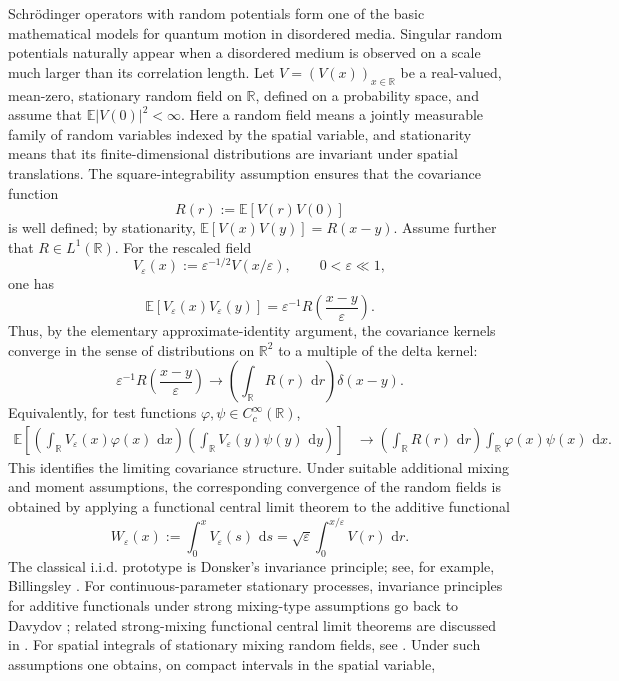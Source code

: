 \documentclass[11pt]{article}
\newcommand{\dd}{\,\mathrm d}
\newcommand{\E}{\mathbb E}
\newcommand{\R}{\mathbb R}
\begin{document}
Schr\"odinger operators with random potentials form one of the basic mathematical models for quantum motion in disordered media. Singular random potentials naturally appear when a disordered medium is observed on a scale much larger than its correlation length. Let
\(
    V=(V(x))_{x\in\R}
\)
be a real-valued, mean-zero, stationary random field on \(\R\), defined on a probability space, and assume that \(\E|V(0)|^2<\infty\). Here a random field means a jointly measurable family of random variables indexed by the spatial variable, and stationarity means that its finite-dimensional distributions are invariant under spatial translations. The square-integrability assumption ensures that the covariance function
\[
    R(r):=\E[V(r)V(0)]
\]
is well defined; by stationarity, \(\E[V(x)V(y)]=R(x-y)\). Assume further that \(R\in L^1(\R)\). For the rescaled field
\[
    V_\varepsilon(x):=\varepsilon^{-1/2}V(x/\varepsilon),
    \qquad 0<\varepsilon\ll1,
\]
one has
\[
    \E[V_\varepsilon(x)V_\varepsilon(y)]
    =\varepsilon^{-1}R\left(\frac{x-y}{\varepsilon}\right).
\]
Thus, by the elementary approximate-identity argument, the covariance kernels converge in the sense of distributions on \(\R^2\) to a multiple of the delta kernel:
\[
    \varepsilon^{-1}R\left(\frac{x-y}{\varepsilon}\right)
    \longrightarrow
    \left(\int_\R R(r)\,\dd r\right)\delta(x-y).
\]
Equivalently, for test functions \(\varphi,\psi\in C_c^\infty(\R)\),
\[
\begin{aligned}
    \E\left[\left(\int_\R V_\varepsilon(x)\varphi(x)\,\dd x\right)
    \left(\int_\R V_\varepsilon(y)\psi(y)\,\dd y\right)\right]
    &\longrightarrow
    \left(\int_\R R(r)\,\dd r\right)
    \int_\R \varphi(x)\psi(x)\,\dd x .
\end{aligned}
\]
This identifies the limiting covariance structure. Under suitable additional mixing and moment assumptions, the corresponding convergence of the random fields is obtained by applying a functional central limit theorem to the additive functional
\[
    W_\varepsilon(x):=\int_0^x V_\varepsilon(s)\,\dd s
    =\sqrt{\varepsilon}\int_0^{x/\varepsilon}V(r)\,\dd r .
\]
The classical i.i.d. prototype is Donsker's invariance principle; see, for example, Billingsley \cite{Billingsley1999}. For continuous-parameter stationary processes, invariance principles for additive functionals under strong mixing-type assumptions go back to Davydov \cite{Davydov1968}; related strong-mixing functional central limit theorems are discussed in \cite{DoukhanMassartRio1994}. For spatial integrals of stationary mixing random fields, see \cite{KampfSpodarev2018}. Under such assumptions one obtains, on compact intervals in the spatial variable,
\end{document}
